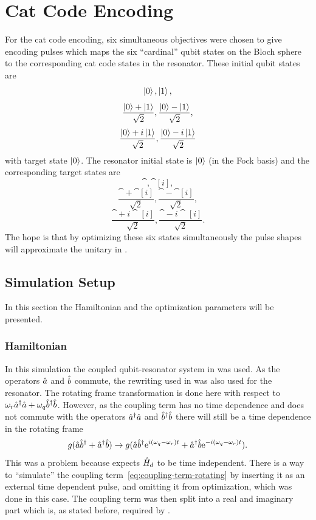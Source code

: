 \documentclass[main.tex]{subfiles}
\begin{document}
\chapter{Cat Code Encoding}
For the cat code encoding, six simultaneous objectives were chosen to give encoding pulses which maps the six ``cardinal'' qubit states on the Bloch sphere to the corresponding cat code states in the resonator.
These initial qubit states are
\[ \ket{0}, \ket{1},\]
\[ \frac{\ket{0}+\ket{1}}{\sqrt{2}}, \frac{\ket{0}-\ket{1}}{\sqrt{2}},\]
\[ \frac{\ket{0}+i\ket{1}}{\sqrt{2}}, \frac{\ket{0}-i\ket{1}}{\sqrt{2}} \]
with target state \(\ket{0}\).
The resonator initial state is \(\ket{0}\) (in the Fock basis) and the corresponding target states are
\[ \cat{}, \cat[i]{},\]
\[ \frac{\cat{}+\cat[i]{}}{\sqrt{2}}, \frac{\cat{}-\cat[i]{}}{\sqrt{2}},\]
\[ \frac{\cat{}+i\cat[i]{}}{\sqrt{2}}, \frac{\cat{}-i\cat[i]{}}{\sqrt{2}}. \]
The hope is that by optimizing these six states simultaneously the pulse shapes will approximate the unitary in .

\section{Simulation Setup}
In this section the Hamiltonian and the optimization parameters will be presented.

\subsection{Hamiltonian}
In this simulation the coupled qubit-resonator system in  was used.
As the operators \(\hat{a}\) and \(\hat{b}\) commute, the rewriting used in  was also used for the resonator.
The rotating frame transformation is done here with respect to \(\omega_{r} \hat{a}^\dagger\hat{a} + \omega_{q} \hat{b}^\dagger\hat{b} \).
However, as the coupling term has no time dependence and does not commute with the operators \(\hat{a}^\dagger\hat{a} \) and \(\hat{b}^\dagger\hat{b} \) there will still be a time dependence in the rotating frame
\begin{equation}
    g(\hat{a}\hat{b}^\dagger + \hat{a}^\dagger\hat{b}) \rightarrow g(\hat{a}\hat{b}^\dagger\mathrm{e}^{i(\omega_q-\omega_r)t} + \hat{a}^\dagger\hat{b}\mathrm{e}^{-i(\omega_q-\omega_r)t}).
    \label{eq:coupling-term-rotating}
\end{equation}
This was a problem because \krotov{} expects \(\hat{H}_d\) to be time independent.
There is a way to ``simulate'' the coupling term~\eqref{eq:coupling-term-rotating} by inserting it as an external time dependent pulse, and omitting it from optimization, which was done in this case.
The coupling term was then split into a real and imaginary part which is, as stated before, required by \krotov{}.
\end{document}
